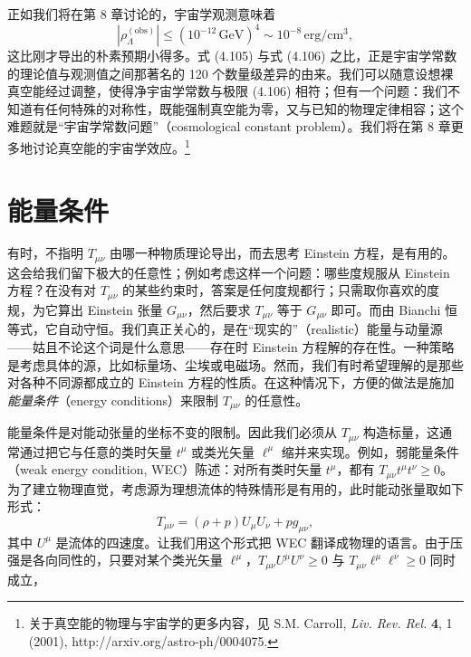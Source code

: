 正如我们将在第 8 章讨论的，宇宙学观测意味着
\begin{equation*}
\left|\rho^{(\mathrm{obs})}_{\Lambda}\right| \leq (10^{-12}\,\mathrm{GeV})^4 \sim 10^{-8}\,\mathrm{erg/cm^3},
\tag{4.106}
\end{equation*}
这比刚才导出的朴素预期小得多。式 (4.105) 与式 (4.106) 之比，正是宇宙学常数的理论值与观测值之间那著名的 120 个数量级差异的由来。我们可以随意设想裸真空能经过调整，使得净宇宙学常数与极限 (4.106) 相符；但有一个问题：我们不知道有任何特殊的对称性，既能强制真空能为零，又与已知的物理定律相容；这个难题就是“宇宙学常数问题”（cosmological constant problem）。我们将在第 8 章更多地讨论真空能的宇宙学效应。\footnote{关于真空能的物理与宇宙学的更多内容，见 S.M. Carroll, \emph{Liv. Rev. Rel.} \textbf{4}, 1 (2001), http://arxiv.org/astro-ph/0004075.}

\section{能量条件}

有时，不指明 $T_{\mu\nu}$ 由哪一种物质理论导出，而去思考 Einstein 方程，是有用的。这会给我们留下极大的任意性；例如考虑这样一个问题：哪些度规服从 Einstein 方程？在没有对 $T_{\mu\nu}$ 的某些约束时，答案是任何度规都行；只需取你喜欢的度规，为它算出 Einstein 张量 $G_{\mu\nu}$，然后要求 $T_{\mu\nu}$ 等于 $G_{\mu\nu}$ 即可。而由 Bianchi 恒等式，它自动守恒。我们真正关心的，是在“现实的”（realistic）能量与动量源——姑且不论这个词是什么意思——存在时 Einstein 方程解的存在性。一种策略是考虑具体的源，比如标量场、尘埃或电磁场。然而，我们有时希望理解的是那些对各种不同源都成立的 Einstein 方程的性质。在这种情况下，方便的做法是施加\emph{能量条件}（energy conditions）来限制 $T_{\mu\nu}$ 的任意性。

能量条件是对能动张量的坐标不变的限制。因此我们必须从 $T_{\mu\nu}$ 构造标量，这通常通过把它与任意的类时矢量 $t^\mu$ 或类光矢量 $\ell^\mu$ 缩并来实现。例如，弱能量条件（weak energy condition, WEC）陈述：对所有类时矢量 $t^\mu$，都有 $T_{\mu\nu}t^\mu t^\nu\geq 0$。为了建立物理直觉，考虑源为理想流体的特殊情形是有用的，此时能动张量取如下形式：
\begin{equation*}
T_{\mu\nu} = (\rho + p)U_\mu U_\nu + pg_{\mu\nu},
\tag{4.107}
\end{equation*}
其中 $U^\mu$ 是流体的四速度。让我们用这个形式把 WEC 翻译成物理的语言。由于压强是各向同性的，只要对某个类光矢量 $\ell^\mu$，$T_{\mu\nu}U^\mu U^\nu \geq 0$ 与 $T_{\mu\nu}\ell^\mu\ell^\nu \geq 0$ 同时成立，
